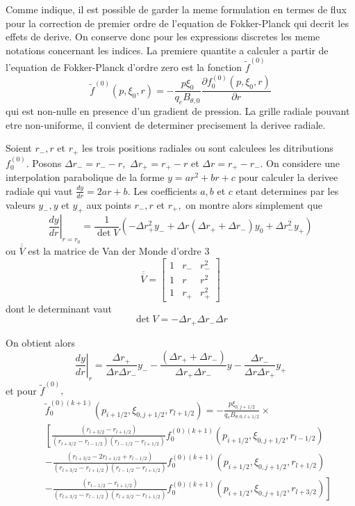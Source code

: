 Comme indique, il est possible de garder la meme formulation en termes
de flux pour la correction de premier ordre de l'equation de Fokker-Planck
qui decrit les effets de derive. On conserve donc pour les expressions
discretes les meme notations concernant les indices. La premiere quantite
a calculer a partir de l'equation de Fokker-Planck d'ordre zero est
la fonction $\widetilde{f}^{(0)}$\[
\widetilde{f}^{(0)}(p,\xi_{0},r)=-\frac{p\xi_{0}}{q_{e}B_{\theta,0}}\frac{\partial f_{0}^{(0)}(p,\xi_{0},r)}{\partial r}\]
 qui est non-nulle en presence d'un gradient de pression. La grille
radiale pouvant etre non-uniforme, il convient de determiner precisement
la derivee radiale.

Soient $r_{-},r$ et $r_{+}$ les trois positions radiales ou sont
calculees les ditributions $f_{0}^{(0)}.$ Posons $\Delta r_{-}=r_{-}-r,$
$\Delta r_{+}=r_{+}-r$ et $\Delta r=r_{+}-r_{-}$. On considere une
interpolation parabolique de la forme $y=ar^{2}+br+c$ pour calculer
la derivee radiale qui vaut $\frac{dy}{dr}=2ar+b.$ Les coefficients
$a,b$ et $c$ etant determines par les valeurs $y_{-},y$ et $y_{+}$
aux points $r_{-},r$ et $r_{+},$ on montre alors simplement que
\[
\left.\frac{dy}{dr}\right|_{r=r_{0}}=\frac{1}{\det V}\left(-\Delta r_{+}^{2}y_{-}+\Delta r\left(\Delta r_{+}+\Delta r_{-}\right)y_{0}+\Delta r_{-}^{2}y_{+}\right)\]
 ou $\overline{\overline{V}}$ est la matrice de Van der Monde d'ordre
3 \[
\overline{\overline{V}}=\left[\begin{array}{lll}
1 & r_{-} & r_{-}^{2}\\
1 & r & r^{2}\\
1 & r_{+} & r_{+}^{2}\end{array}\right]\]
 dont le determinant vaut \[
\det V=-\Delta r_{+}\Delta r_{-}\Delta r\]


On obtient alors \[
\left.\frac{dy}{dr}\right|_{r}=\frac{\Delta r_{+}}{\Delta r\Delta r_{-}}y_{-}-\frac{\left(\Delta r_{+}+\Delta r_{-}\right)}{\Delta r_{+}\Delta r_{-}}y-\frac{\Delta r_{-}}{\Delta r\Delta r_{+}}y_{+}\]
 et pour $\widetilde{f}^{(0)},$\begin{eqnarray*}
 &  & \widetilde{f}_{0}^{(0)(k+1)}(p_{i+1/2},\xi_{0,j+1/2},r_{l+1/2})=-\frac{p\xi_{0,j+1/2}}{q_{e}B_{\theta,0,l+1/2}}\times\\
 &  & \left[\frac{\left(r_{l+3/2}-r_{l+1/2}\right)}{\left(r_{l+3/2}-r_{l-1/2}\right)\left(r_{l-1/2}-r_{l+1/2}\right)}f_{0}^{(0)(k+1)}(p_{i+1/2},\xi_{0,j+1/2},r_{l-1/2})\right.\\
 &  & -\frac{\left(r_{l+3/2}-2r_{l+1/2}+r_{l-1/2}\right)}{\left(r_{l+3/2}-r_{l+1/2}\right)\left(r_{l-1/2}-r_{l+1/2}\right)}f_{0}^{(0)(k+1)}(p_{i+1/2},\xi_{0,j+1/2},r_{l+1/2})\\
 &  & -\left.\frac{\left(r_{l-1/2}-r_{l+1/2}\right)}{\left(r_{l+3/2}-r_{l-1/2}\right)\left(r_{l+3/2}-r_{l+1/2}\right)}f_{0}^{(0)(k+1)}(p_{i+1/2},\xi_{0,j+1/2},r_{l+3/2})\right]\end{eqnarray*}


